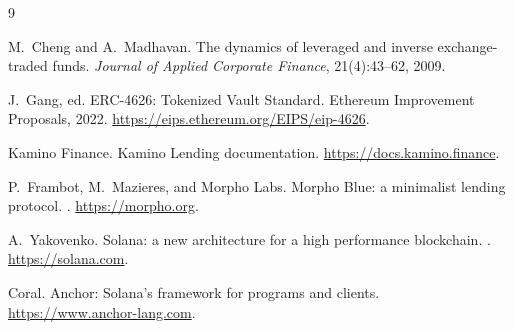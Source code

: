 \documentclass[11pt]{article}
\theoremstyle{remark}
\begin{document}
\begin{thebibliography}{9}

M.~Cheng and A.~Madhavan.
\newblock The dynamics of leveraged and inverse exchange-traded funds.
\newblock \emph{Journal of Applied Corporate Finance}, 21(4):43--62, 2009.

J.~Gang, ed.
\newblock ERC-4626: Tokenized Vault Standard.
\newblock Ethereum Improvement Proposals, 2022.
\newblock \url{https://eips.ethereum.org/EIPS/eip-4626}.

Kamino Finance.
\newblock Kamino Lending documentation.
\newblock \url{https://docs.kamino.finance}.

P.~Frambot, M.~Mazieres, and Morpho Labs.
\newblock Morpho Blue: a minimalist lending protocol.
.
\newblock \url{https://morpho.org}.

A.~Yakovenko.
\newblock Solana: a new architecture for a high performance blockchain.
.
\newblock \url{https://solana.com}.

Coral.
\newblock Anchor: Solana's framework for programs and clients.
\newblock \url{https://www.anchor-lang.com}.

\end{thebibliography}
\end{document}
